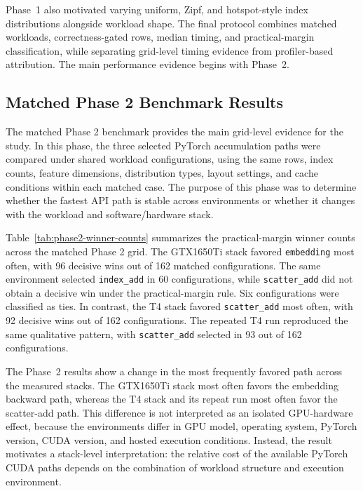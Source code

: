 Phase~1 also motivated varying uniform, Zipf, and hotspot-style index distributions alongside workload shape. The final protocol combines matched workloads, correctness-gated rows, median timing, and practical-margin classification, while separating grid-level timing evidence from profiler-based attribution. The main performance evidence begins with Phase~2.

\subsection{Matched Phase 2 Benchmark Results}

The matched Phase 2 benchmark provides the main grid-level evidence for the study. In this phase, the three selected PyTorch accumulation paths were compared under shared workload configurations, using the same rows, index counts, feature dimensions, distribution types, layout settings, and cache conditions within each matched case. The purpose of this phase was to determine whether the fastest API path is stable across environments or whether it changes with the workload and software/hardware stack.

Table~\ref{tab:phase2-winner-counts} summarizes the practical-margin winner counts across the matched Phase 2 grid. The GTX1650Ti stack favored \texttt{embedding} most often, with 96 decisive wins out of 162 matched configurations. The same environment selected \texttt{index\_add} in 60 configurations, while \texttt{scatter\_add} did not obtain a decisive win under the practical-margin rule. Six configurations were classified as ties. In contrast, the T4 stack favored \texttt{scatter\_add} most often, with 92 decisive wins out of 162 configurations. The repeated T4 run reproduced the same qualitative pattern, with \texttt{scatter\_add} selected in 93 out of 162 configurations.



The Phase~2 results show a change in the most frequently favored path across the measured stacks. The GTX1650Ti stack most often favors the embedding backward path, whereas the T4 stack and its repeat run most often favor the scatter-add path. This difference is not interpreted as an isolated GPU-hardware effect, because the environments differ in GPU model, operating system, PyTorch version, CUDA version, and hosted execution conditions. Instead, the result motivates a stack-level interpretation: the relative cost of the available PyTorch CUDA paths depends on the combination of workload structure and execution environment.

